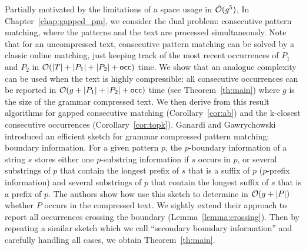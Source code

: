 Partially motivated by the limitations of a space usage in $\tilde {\mathcal{O}}(g^5)$, In Chapter~\ref{chap:gapped_pm}, we consider the dual problem: consecutive pattern matching, where the patterns and the text are processed simultaneously. Note that for an uncompressed text, consecutive pattern matching can be solved by a classic online matching, just keeping track of the most recent occurrences of $P_1$ and $P_2$ in $\mathcal{O}(|T|+|P_1|+|P_2|+\mathsf{occ})$ time.
We show that an analogue complexity can be used when the text is highly compressible: all consecutive occurrences can be reported in $\mathcal{O}(g+|P_1|+|P_2|+\mathsf{occ})$ time (see Theorem~\ref{th:main}) where $g$ is the size of the grammar compressed text. We then derive from this result algorithms for gapped consecutive matching (Corollary~\ref{cor:ab}) and the k-closest consecutive occurrences (Corollary~\ref{cor:topk}).
Ganardi and Gawrychowski~\cite{DBLP:conf/soda/GanardiG22} introduced an efficient sketch for grammar compressed pattern matching: boundary information. For a given pattern $p$, the $p$-boundary information of a string $s$ stores either one $p$-substring information if $s$ occurs in $p$, or several substrings of $p$ that contain the longest prefix of $s$ that is a suffix of $p$ ($p$-prefix information) and several substrings of $p$ that contain the longest suffix of $s$ that is a prefix of $p$. The authors show how use this sketch to determine in $\mathcal{O}(g+|P|)$ whether $P$ occurs in the compressed text. We sightly extend their approach to report all occurrences crossing the boundary (Lemma~\ref{lemma:crossing}). Then by repeating a similar sketch which we call ``secondary boundary information'' and  carefully handling all cases, we obtain Theorem~\ref{th:main}.

